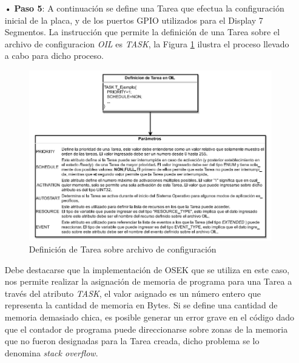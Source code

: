 \documentclass[12pt,letterpaper]{article}
\begin{document}
\begin{enumerate}
\item[•]\textbf{Paso 5}: A continuación se define una Tarea que efectua la configuración inicial de la placa, y de los puertos GPIO utilizados para el Display 7 Segmentos. La instrucción que permite la definición de una Tarea sobre el archivo de configuracion \textit{OIL} es \textit{TASK}, la Figura \ref{Fig38} ilustra el proceso llevado a cabo para dicho proceso. 
\begin{figure}[H]
\centering
\includegraphics[width=15 cm]{figuras/f21.png}
\caption{Definición de Tarea sobre archivo de configuración}
\label{Fig38}
\end{figure}
Debe destacarse que la implementación de OSEK que se utiliza en este caso, nos permite realizar la asignación de memoria de programa para una Tarea a través del atributo \textit{TASK}, el valor asignado es un número entero que representa la cantidad de memoria en Bytes. Si se define una cantidad de memoria demasiado chica, es posible generar un error grave en el código dado que el contador de programa puede direccionarse sobre zonas de la memoria que no fueron designadas para la Tarea creada, dicho problema se lo denomina \textit{stack overflow}.


\end{enumerate}
\end{document}
